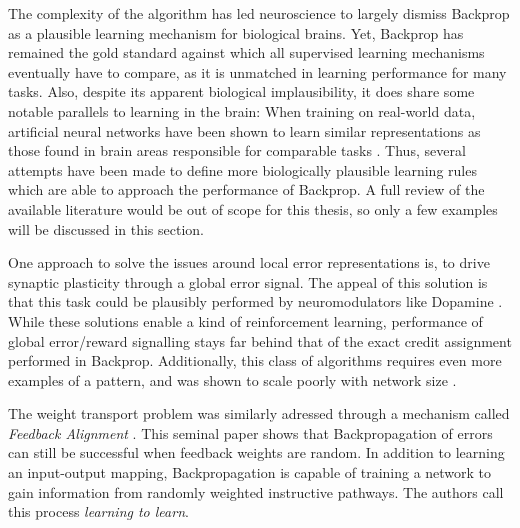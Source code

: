 The complexity of the algorithm has led neuroscience to largely dismiss Backprop as a plausible learning mechanism for
biological brains. Yet, Backprop has remained the gold standard against which all supervised learning mechanisms
eventually have to compare, as it is unmatched in learning performance for many tasks. Also, despite its apparent
biological implausibility, it does share some notable parallels to learning in the brain: When training on real-world
data, artificial neural networks have been shown to learn similar representations as those found in brain areas
responsible for comparable tasks \cite{McClelland1995,barone2000laminarwhittington2019theories,Yamins2016}. Thus,
several attempts have been made to define more biologically plausible learning rules which are able to approach the
performance of  Backprop. A full review of the available literature would be out of scope for this thesis, so only a few
examples will be discussed in this section.
\newline

One approach to solve the issues around local error representations is, to drive synaptic plasticity through a global
error signal. The appeal of this solution is that this task could be plausibly performed by neuromodulators like
Dopamine \citep{Mazzoni1991,Seung2003,izhikevich2007solving}. While these solutions enable a kind of reinforcement
learning, performance of global error/reward signalling stays far behind that of the exact credit assignment performed
in Backprop. Additionally, this class of algorithms requires even more examples of a pattern, and was shown to scale
poorly with network size \citep{Werfel2003}. 


The weight transport problem was similarly adressed through a mechanism called \textit{Feedback Alignment}
\cite{Lillicrap2014}. This seminal paper shows that Backpropagation of errors can still be successful when feedback 
weights are random. In addition to learning an input-output mapping, Backpropagation is capable of training a network
to gain information from randomly weighted instructive pathways. The authors call this process \textit{learning to learn}.




